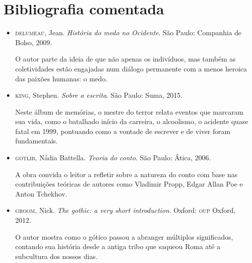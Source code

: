 \documentclass[12pt]{extarticle}
\begin{document}
\section{Bibliografia comentada}

\begin{itemize}
\item\textsc{delumeau}, Jean. \textit{História do medo no Ocidente}. São Paulo:
Companhia de Bolso, 2009.

O autor parte da ideia de que não apenas os indivíduos, mas também as
coletividades estão engajadas num diálogo permanente com a menos heroica
das paixões humanas: o medo.

\item\textsc{king}, Stephen. \textit{Sobre a escrita}. São Paulo: Suma, 2015.

Neste álbum de memórias, o mestre do terror relata eventos que marcaram
sua vida, como o batalhado início da carreira, o alcoolismo, o acidente
quase fatal em 1999, pontuando como a vontade de escrever e de viver
foram fundamentais.

\item\textsc{gotlib}, Nádia Battella. \textit{Teoria do conto}. São Paulo: Ática, 2006.

A obra convida o leitor a refletir sobre a natureza do conto com base
nas contribuições teóricas de autores como Vladimir Propp, Edgar Allan
Poe e Anton Tchekhov.

\item\textsc{groom}, Nick. \textit{The gothic: a very short introduction}. Oxford: \textsc{oup} Oxford, 2012.

O autor mostra como o gótico passou a abranger múltiplos significados,
contando sua história desde a antiga tribo que saqueou Roma até a
subcultura dos nossos dias.
\end{itemize}
\end{document}
